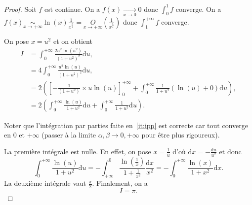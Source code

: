 \documentclass[12pt]{article}
\begin{document}
\begin{proof}
    Soit \function{f}{]0,+\infty}{\R}{x}{\frac{\sqrt{x}\ln(x)}{(1+x)^{2}}}
    $f$ est continue. On a $f(x)\xrightarrow[x\to0]{}0$ donc $\int_{0}^{1}f$ converge. On a $f(x)\underset{x\to+\infty}{\sim}\ln(x)\frac{1}{x^{\frac{3}{2}}}=\underset{x\to+\infty}{O}\left(\frac{1}{x^{\frac{5}{4}}}\right)$ donc $\int_{1}^{+\infty}f$ converge.

    On pose $x=u^{2}$ et on obtient 
    \begin{align}
        I
        &=\int_{0}^{+\infty}\frac{2u^{2}\ln(u^{2})}{(1+u^{2})^{2}}\mathrm{d}u,\\
        &=4\int_{0}^{+\infty}\frac{u^{2}\ln(u)}{(1+u^{2})^{2}}\mathrm{d}u,\\
        &=2\left(\left[-\frac{1}{(1+u^{2})}\times u\ln(u)\right]_{0}^{+\infty}+\int_{0}^{+\infty}\frac{1}{1+u^{2}}\left(\ln(u)+0\right)\mathrm{d}u\right),\label{it:ipp}\\
        &=2\left(\int_{0}^{+\infty}\frac{\ln(u)}{1+u^{2}}\mathrm{d}u+\int_{0}^{+\infty}\frac{1}{1+u^{2}}\mathrm{d}u\right).
    \end{align}

    Noter que l'intégration par parties faite en~\ref{it:ipp} est correcte car tout converge en 0 et $+\infty$ (passer à la limite $\alpha,\beta\to0,+\infty$ pour être plus rigoureux).

    La première intégrale est nulle. En effet, on pose $x=\frac{1}{u}$ d'où $\mathrm{d}x=-\frac{\mathrm{d}u}{u^{2}}$ et donc 
    \begin{equation}
        \int_{0}^{+\infty}\frac{\ln(u)}{1+u^{2}}\mathrm{d}u=-\int_{+\infty}^{0}\frac{\ln\left(\frac{1}{x}\right)}{1+\frac{1}{x^{2}}}\frac{\mathrm{d}x}{x^{2}}=-\int_{0}^{+\infty}\frac{\ln(x)}{1+x^{2}}\mathrm{d}x.
    \end{equation}
    La deuxième intégrale vaut $\frac{\pi}{2}$. Finalement, on a 
    \begin{equation}
        \boxed{
            I=\pi.
        }
    \end{equation}
\end{proof}
\end{document}
